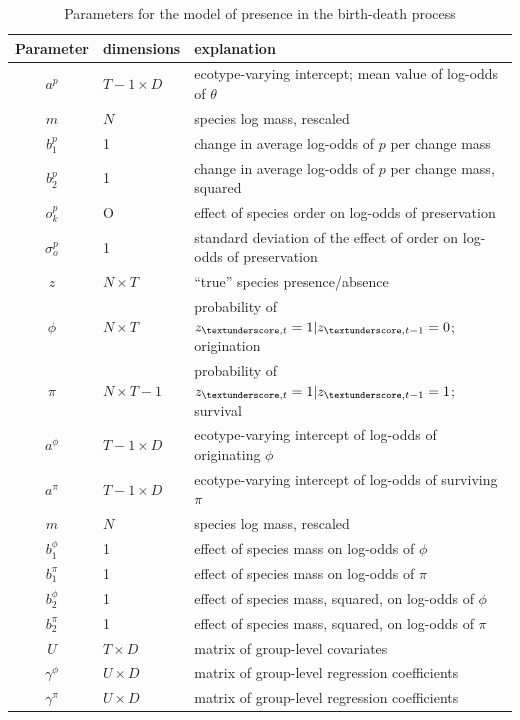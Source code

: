 \documentclass[12pt,letterpaper]{article}
\begin{document}
\begin{table}
  \centering
  \caption{Parameters for the model of presence in the birth-death process}
  \begin{tabular}{c l l}
    Parameter & dimensions & explanation \\
    \hline
    \(a^{p}\) & \(T - 1 \times D\) & ecotype-varying intercept; mean value of log-odds of \(\theta\) \\
    \(m\) & \(N\) & species log mass, rescaled \\
    \(b^{p}_{1}\) & 1 & change in average log-odds of \(p\) per change mass \\
    \(b^{p}_{2}\) & 1 & change in average log-odds of \(p\) per change mass, squared \\
    \(o^{p}_{k}\) & O & effect of species order on log-odds of preservation \\
    \(\sigma^{p}_{o}\) & 1 & standard deviation of the effect of order on log-odds of preservation \\
    \(z\) & \(N \times T\) & ``true'' species presence/absence \\
    \(\phi\) & \(N \times T\) & probability of \(z_{\textunderscore, t} = 1 | z_{\textunderscore, t - 1} = 0 \); origination \\
    \(\pi\) & \(N \times T - 1\) & probability of \(z_{\textunderscore, t} = 1 | z_{\textunderscore, t - 1} = 1 \); survival \\
    \(a^{\phi}\) & \(T - 1 \times D\) & ecotype-varying intercept of log-odds of originating \(\phi\) \\
    \(a^{\pi}\) & \(T - 1 \times D\) & ecotype-varying intercept of log-odds of surviving \(\pi\) \\
    \(m\) & \(N\) & species log mass, rescaled \\
    \(b^{\phi}_{1}\) & 1 & effect of species mass on log-odds of \(\phi\) \\
    \(b^{\pi}_{1}\) & 1 & effect of species mass on log-odds of \(\pi\) \\
    \(b^{\phi}_{2}\) & 1 & effect of species mass, squared, on log-odds of \(\phi\) \\
    \(b^{\pi}_{2}\) & 1 & effect of species mass, squared, on log-odds of \(\pi\) \\
    \(U\) & \(T \times D\) & matrix of group-level covariates \\
    \(\gamma^{\phi}\) & \(U \times D\) & matrix of group-level regression coefficients \\
    \(\gamma^{\pi}\) & \(U \times D\) & matrix of group-level regression coefficients \\

\end{tabular}
\end{table}
\end{document}
